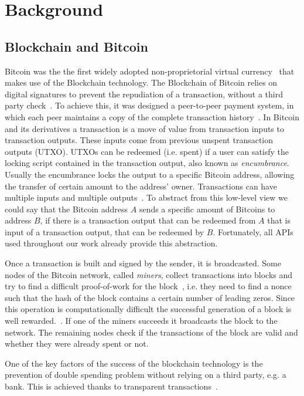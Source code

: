 \section{Background} \label{background}
\subsection{Blockchain and Bitcoin}
Bitcoin was the the first widely adopted non-proprietorial virtual
currency~\cite{bib:respCrypto} that makes use of the
Blockchain technology. The Blockchain of Bitcoin relies on digital
signatures to prevent the repudiation of a transaction, without a third
party check~\cite{bib:anonAnalysis}.
To achieve this, it was designed a peer-to-peer payment system,
in which each peer maintains a copy of the complete transaction
history~\cite{bib:fistful}.
In Bitcoin and its derivatives a transaction is a move of value
from transaction inputs to transaction outputs.
These inputs come from previous unspent transaction outputs (UTXO).
UTXOs can be redeemed (i.e. spent) if a user can satisfy the locking
script contained in the transaction output, also known as \emph{encumbrance}.
Usually the encumbrance locks the output to a specific Bitcoin address,
allowing the transfer of certain amount to the address' owner.
Transactions can have multiple inputs and multiple
outputs~\cite{bib:bitcoin:mastering}.
To abstract from this low-level view we could say that the Bitcoin
address $A$ sends a specific amount of Bitcoins to address $B$,
if there is a transaction output that can be redeemed from $A$ that
is input of a transaction output, that can be redeemed by $B$.
Fortunately, all APIs used throughout our work already provide this
abstraction.

Once a transaction is built and signed by the
sender, it is broadcasted. Some nodes of the Bitcoin network, called
\textit{miners}, collect transactions into blocks and try to find a difficult
proof-of-work for the block~\cite{bib:hashcash, bib:pricing}, i.e. they
need to find a nonce such that the hash of the block contains a certain number
of leading zeros. Since this operation is
computationally difficult the successful generation of a block is well
rewarded.~\cite{bib:satoshi}. If one of the miners succeeds it broadcasts the
block to the network. The remaining nodes check if the transactions of the
block are valid and whether they were already spent or not.

One of the key factors of the success of the blockchain technology
is the prevention of double spending problem without relying on a third party,
e.g. a bank. This is achieved thanks to transparent
transactions~\cite{bib:bitcoinbeyond}.

